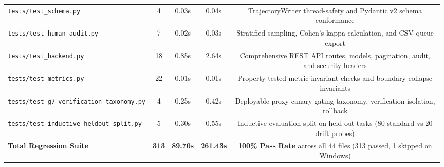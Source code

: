 \begin{table}[t]
\begin{tabular}{lcccc}
\texttt{tests/test\_schema.py} & 4 & 0.03s & 0.04s & TrajectoryWriter thread-safety and Pydantic v2 schema conformance \\
\texttt{tests/test\_human\_audit.py} & 7 & 0.02s & 0.03s & Stratified sampling, Cohen's kappa calculation, and CSV queue export \\
\texttt{tests/test\_backend.py} & 18 & 0.85s & 2.64s & Comprehensive REST API routes, models, pagination, audit, and security headers \\
\texttt{tests/test\_metrics.py} & 22 & 0.01s & 0.01s & Property-tested metric invariant checks and boundary collapse invariants \\
\texttt{tests/test\_g7\_verification\_taxonomy.py} & 4 & 0.25s & 0.42s & Deployable proxy canary gating taxonomy, verification isolation, rollback \\
\texttt{tests/test\_inductive\_heldout\_split.py} & 5 & 0.30s & 0.55s & Inductive evaluation split on held-out tasks (80 standard vs 20 drift probes) \\
\midrule
\textbf{Total Regression Suite} & \textbf{313} & \textbf{89.70s} & \textbf{261.43s} & \textbf{100\% Pass Rate} across all 44 files (313 passed, 1 skipped on Windows) \\
\bottomrule
\end{tabular}
\end{table}
